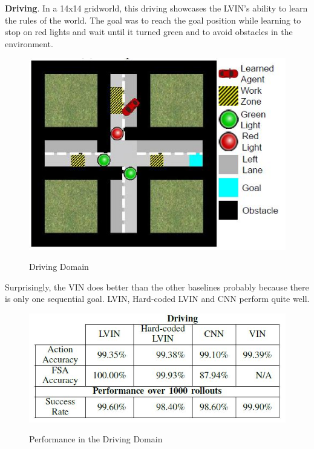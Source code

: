 \documentclass[letterpaper, 10 pt, conference]{ieeeconf}  %
\begin{document}
\textbf{Driving}. In a 14x14 gridworld, this driving showcases the LVIN's ability to learn the rules of the world. The goal was to reach the goal position while learning to stop on red lights and wait until it turned green and to avoid obstacles in the environment.
\begin{figure}[h]
 \centering
 \includegraphics[scale=.5]{Driving.JPG}\\
 \caption{Driving Domain}
\end{figure}
Surprisingly, the VIN does better than the other baselines probably because there is only one sequential goal. LVIN, Hard-coded LVIN and CNN perform quite well.
\begin{figure}[h]
 \centering
 \includegraphics[scale=.6]{DrivingResults.JPG}\\
 \caption{Performance in the Driving Domain}
\end{figure}
\end{document}
